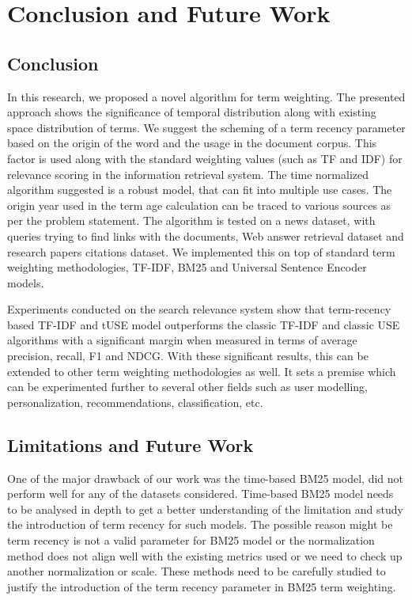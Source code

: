 \chapter{Conclusion and Future Work}
\section{Conclusion}
In this research, we proposed a novel algorithm for term weighting. The presented approach shows the significance of temporal distribution along with existing space distribution of terms. We suggest the scheming of a term recency parameter based on the origin of the word and the usage in the document corpus. This factor is used along with the standard weighting values (such as TF and IDF) for relevance scoring in the information retrieval system. The time normalized algorithm suggested is a robust model, that can fit into multiple use cases. The origin year used in the term age calculation can be traced to various sources as per the problem statement. The algorithm is tested on a news dataset, with queries trying to find links with the documents, Web answer retrieval dataset and research papers citations dataset. We implemented this on top of standard term weighting methodologies, TF-IDF, BM25 and Universal Sentence Encoder models.

Experiments conducted on the search relevance system show that term-recency based TF-IDF and tUSE model outperforms the classic TF-IDF and classic USE algorithms with a significant margin when measured in terms of average precision, recall, F1 and NDCG. 
With these significant results, this can be extended to other term weighting methodologies as well. It sets a premise which can be experimented further to several other fields such as user modelling, personalization, recommendations, classification, etc.

\section{Limitations and Future Work}
One of the major drawback of our work was the time-based BM25 model, did not perform well for any of the datasets considered. Time-based BM25 model needs to be analysed in depth to get a better understanding of the limitation and study the introduction of term recency for such models. The possible reason might be term recency is not a valid parameter for BM25 model or the normalization method does not align well with the existing metrics used or we need to check up another normalization or scale. These methods need to be carefully studied to justify the introduction of the term recency parameter in BM25 term weighting.

